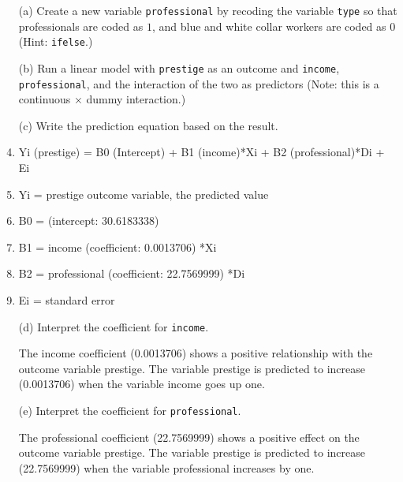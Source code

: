 \documentclass[12pt,letterpaper]{article}
\begin{document}
	\newpage
	\begin{enumerate}
		
		\item [(a)]
		Create a new variable \texttt{professional} by recoding the variable \texttt{type} so that professionals are coded as $1$, and blue and white collar workers are coded as $0$ (Hint: \texttt{ifelse}.)
		

		  			

		\vspace{3cm}
		
		
		\item [(b)]
		Run a linear model with \texttt{prestige} as an outcome and \texttt{income}, \texttt{professional}, and the interaction of the two as predictors (Note: this is a continuous $\times$ dummy interaction.)
		
		  
		\vspace{3cm}
		\item [(c)]
		Write the prediction equation based on the result.
		\vspace{1cm}
		\item  Yi (prestige) = B0 (Intercept) + B1 (income)*Xi + B2 (professional)*Di + Ei
		
		\item  Yi = prestige outcome variable, the predicted value
		\item  B0 = (intercept: 30.6183338) 
		\item  B1 = income (coefficient:  0.0013706) *Xi
		\item  B2 = professional (coefficient: 22.7569999) *Di
		\item  Ei  =  standard error 
			
		
		\newpage
		\item [(d)]
		Interpret the coefficient for \texttt{income}.
		\vspace{1cm}
		
		\noindent  The income coefficient (0.0013706) shows a positive relationship with the outcome variable prestige. The variable prestige is predicted to increase (0.0013706) when the variable income goes up one. 
		
		\vspace{5cm}	
		\item [(e)]
		Interpret the coefficient for \texttt{professional}.
		\vspace{1cm}
		
		\noindent  The professional coefficient (22.7569999) shows a positive effect on the outcome variable prestige. The variable prestige is predicted to increase (22.7569999) when the variable professional increases by one. 
		

\end{enumerate}
\end{document}
